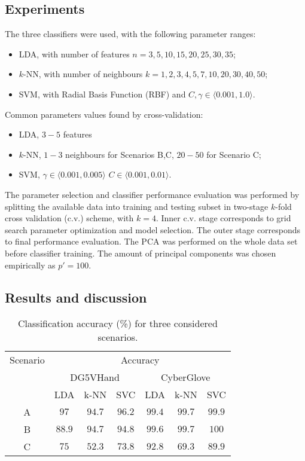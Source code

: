 \documentclass[]{article}
\begin{document}
\subsection{Experiments}

The three classifiers were used, with the following parameter ranges:
\begin{itemize}
\item LDA, with number of features $n=3,5,10,15,20,25,30,35$;
\item $k$-NN, with number of neighbours $k=1,2,3,4,5,7,10,20,30,40,50$;
\item SVM, with Radial Basis Function (RBF) and 
$C,\gamma \in \langle 0.001, 1.0 \rangle$.
\end{itemize} 

Common parameters values found by cross-validation: 
\begin{itemize}
\item LDA, $3-5$ features
\item $k$-NN, $1-3$ neighbours for Scenarios B,C, $20-50$ for Scenario C;
\item SVM, 
$\gamma \in \langle 0.001, 0.005\rangle$ $C \in \langle 0.001, 0.01\rangle$.
\end{itemize} 

The parameter selection and classifier performance evaluation was performed by
splitting the available data into training and testing subset in two-stage
$k$-fold cross validation (c.v.) scheme, with $k=4$. Inner c.v. stage
corresponds to grid search parameter optimization and model selection. The outer
stage corresponds to final performance evaluation. The PCA was performed on the
whole data set before classifier training. The amount of principal components
was chosen empirically as $p'=100$.

\subsection{Results and discussion}

\begin{table}[h]
\centering
\begin{tabular}{ccccccc}
\toprule
Scenario&\multicolumn{6}{c}{Accuracy}\\ 
\cmidrule(r){2-7}
&\multicolumn{3}{c}{DG5VHand}&\multicolumn{3}{c}{CyberGlove}\\ 
\cmidrule(r){2-4}\cmidrule(r){5-7}
&LDA&k-NN&SVC&LDA&k-NN&SVC\\
\midrule
A&$97$&$94.7$&$96.2$&$99.4$&$99.7$&$99.9$\\
B&$88.9$&$94.7$&$94.8$&$99.6$&$99.7$&$100$\\
C&$75$&$52.3$&$73.8$&$92.8$&$69.3$&$89.9$\\
\bottomrule
\end{tabular} 
\caption{Classification accuracy (\%) for three considered scenarios.}
\label{id:table:mean_accuracy}
\end{table}
\end{document}
